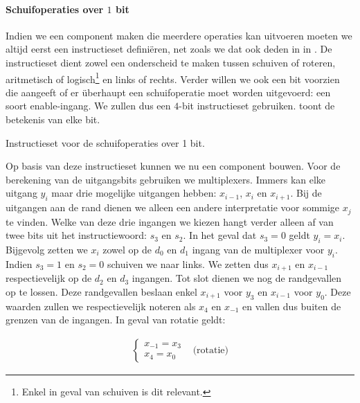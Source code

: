 \paragraph{Schuifoperaties over $1$ bit}
Indien we een component maken die meerdere operaties kan uitvoeren moeten we altijd eerst een instructieset defini\"eren, net zoals we dat ook deden in in . De instructieset dient zowel een onderscheid te maken tussen schuiven of roteren, aritmetisch of logisch\footnote{Enkel in geval van schuiven is dit relevant.} en links of rechts. Verder willen we ook een bit voorzien die aangeeft of er \"uberhaupt een schuifoperatie moet worden uitgevoerd: een soort enable-ingang. We zullen dus een $4$-bit instructieset gebruiken.  toont de betekenis van elke bit.
\begin{table}[hbt]
\centering
{}
\caption{Instructieset voor de schuifoperaties over 1 bit.}
\end{table}
Op basis van deze instructieset kunnen we nu een component bouwen. Voor de berekening van de uitgangsbits gebruiken we multiplexers. Immers kan elke uitgang $y_i$ maar drie mogelijke uitgangen hebben: $x_{i-1}$, $x_i$ en $x_{i+1}$. Bij de uitgangen aan de rand dienen we alleen een andere interpretatie voor sommige $x_j$ te vinden. Welke van deze drie ingangen we kiezen hangt verder alleen af van twee bits uit het instructiewoord: $s_3$ en $s_2$. In het geval dat $s_3=0$ geldt $y_i=x_i$. Bijgevolg zetten we $x_i$ zowel op de $d_0$ en $d_1$ ingang van de multiplexer voor $y_i$. Indien $s_3=1$ en $s_2=0$ schuiven we naar links. We zetten dus $x_{i+1}$ en $x_{i-1}$ respectievelijk op de $d_2$ en $d_3$ ingangen. Tot slot dienen we nog de randgevallen op te lossen. Deze randgevallen beslaan enkel $x_{i+1}$ voor $y_3$ en  $x_{i-1}$ voor $y_0$. Deze waarden zullen we respectievelijk noteren als $x_4$ en $x_{-1}$ en vallen dus buiten de grenzen van de ingangen. In geval van rotatie geldt:

\begin{equation}
\begin{array}{ll}
\left\{\begin{array}{l}
x_{-1}=x_3\\
x_4=x_0
\end{array}\right.&\mbox{(rotatie)}
\end{array}
\end{equation}

